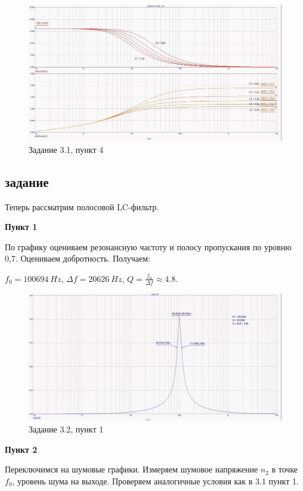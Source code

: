 \documentclass[a4paper, 14pt]{extarticle}%
\begin{document}
\begin{figure}[h!]
			\centering
			\includegraphics[width=1.1\linewidth]{3/3_1_3.jpg}
			\caption{Задание 3.1, пункт 4}
			\label{A}
\end{figure}

\subsection{задание}

Теперь рассматрим полосовой LC-фильтр.

\textbf{Пункт 1}


По графику оцениваем резонансную частоту и полосу пропускания по уровню 0,7. Оцениваем добротность. Получаем:

$f_0 = 100694 \: Hz$, $\Delta f = 20626 \: Hz$, $Q = \frac{f_0}{\Delta f} \approx 4.8$.

\begin{figure}[h!]
			\centering
			\includegraphics[width=1.1\linewidth]{3/3_2_1.jpg}
			\caption{Задание 3.2, пункт 1}
			\label{A}
\end{figure}

\textbf{Пункт 2}


Переключимся на шумовые графики. Измеряем шумовое напряжение $n_2$ в точке $f_0$, уровень шума на выходе.
Проверяем аналогичные условия как в 3.1 пункт 1.
\end{document}
